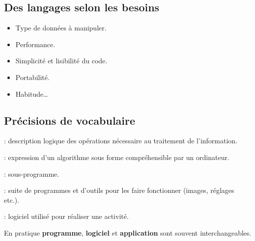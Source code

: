 \subsection{Des langages selon les besoins}
\begin{slide}
	\begin{itemize}
		\item Type de données à manipuler.
		\item Performance.
		\item Simplicité et lisibilité du code.
		\item Portabilité.
		\item Habitude… 
	\end{itemize}
\end{slide}





\subsection{Précisions de vocabulaire}
\begin{slide}
	\small
	\begin{description}
	  \item[Algorithme] : description logique des opérations nécessaire au traitement de l'information.
		\item[Programme] : expression d'un algorithme sous forme compréhensible par un ordinateur.
		\item[Fonction] : sous-programme.
		\item[Logiciel] : suite de programmes et d'outils pour les faire fonctionner (images, réglages etc.).
		\item[Application] : logiciel utilisé pour réaliser une activité. %
		\item En pratique \textbf{programme}, \textbf{logiciel} et \textbf{application} sont souvent interchangeables.
	\end{description}

\end{slide}
